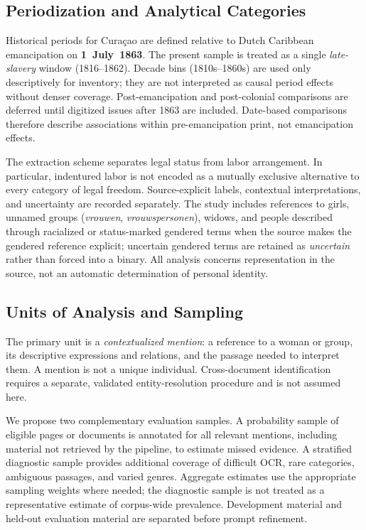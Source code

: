 \documentclass[sigconf]{acmart}
\begin{document}
\subsection{Periodization and Analytical Categories}

Historical periods for Cura\c{c}ao are defined relative to Dutch Caribbean emancipation on \textbf{1~July~1863}. The present sample is treated as a single \emph{late-slavery} window (1816--1862). Decade bins (1810s--1860s) are used only descriptively for inventory; they are not interpreted as causal period effects without denser coverage. Post-emancipation and post-colonial comparisons are deferred until digitized issues after 1863 are included. Date-based comparisons therefore describe associations within pre-emancipation print, not emancipation effects.

The extraction scheme separates legal status from labor arrangement. In particular, indentured labor is not encoded as a mutually exclusive alternative to every category of legal freedom. Source-explicit labels, contextual interpretations, and uncertainty are recorded separately. The study includes references to girls, unnamed groups (\textit{vrouwen}, \textit{vrouwspersonen}), widows, and people described through racialized or status-marked gendered terms when the source makes the gendered reference explicit; uncertain gendered terms are retained as \emph{uncertain} rather than forced into a binary. All analysis concerns representation in the source, not an automatic determination of personal identity.

\subsection{Units of Analysis and Sampling}

The primary unit is a \emph{contextualized mention}: a reference to a woman or group, its descriptive expressions and relations, and the passage needed to interpret them. A mention is not a unique individual. Cross-document identification requires a separate, validated entity-resolution procedure and is not assumed here.

We propose two complementary evaluation samples. A probability sample of eligible pages or documents is annotated for all relevant mentions, including material not retrieved by the pipeline, to estimate missed evidence. A stratified diagnostic sample provides additional coverage of difficult OCR, rare categories, ambiguous passages, and varied genres. Aggregate estimates use the appropriate sampling weights where needed; the diagnostic sample is not treated as a representative estimate of corpus-wide prevalence. Development material and held-out evaluation material are separated before prompt refinement.
\end{document}
